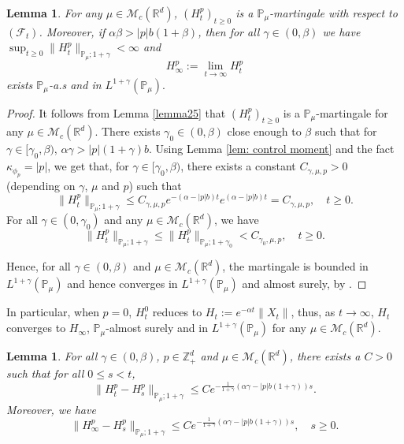 \documentclass[12pt,a4paper]{amsart}
\theoremstyle{plain}
\newtheorem{lem}[thm]{Lemma}
\theoremstyle{definition}
\numberwithin{equation}{section}
\begin{document}
\begin{lem}\label{lemma26}
    For any $\mu\in \mathcal M_c(\mathbb R^d)$, $(H^p_t)_{t\geq 0}$ is a $\mathbb P_\mu$-martingale with respect to $(\mathscr F_t)$. Moreover, if $\alpha\beta>|p|b(1+\beta)$, then for all $\gamma\in (0, \beta)$ we have $\sup_{t\geq 0}\|H_t^p\|_{\mathbb P_\mu;1+\gamma}< \infty$ and
\[
    H_{\infty}^p
    :=\lim_{t\rightarrow \infty}H_t^p
\]
exists $\mathbb{P}_{\mu}$-a.s and in $L^{1+\gamma}(\mathbb{P}_{\mu}).$
\end{lem}
\begin{proof}
  It follows from Lemma \ref{lemma25} that $(H_t^p)_{t\geq 0}$ is a $\mathbb P_\mu$-martingale for any $\mu\in \mathcal M_c(\mathbb R^d)$.
    There exists $\gamma_0 \in (0,\beta)$ close enough to $\beta$ such that for $\gamma\in [\gamma_0, \beta)$, $\alpha\gamma>|p|(1+\gamma)b$.
    Using  Lemma \ref{lem: control moment} and the fact $\kappa_{\phi_p}=|p|$,
   we get that, for $\gamma\in [\gamma_0, \beta)$, there exists
    a constant $C_{\gamma, \mu, p}>0$ (depending on $\gamma$, $\mu$ and $p$)  such that
\[
 	\|H_t^p\|_{\mathbb P_\mu;1+\gamma}
    \leq C_{\gamma, \mu, p} e^{-(\alpha-|p|b)t}e^{(\alpha-|p|b)t}
    =C_{\gamma, \mu, p}, \quad t\geq 0.
\]
   For all $\gamma\in (0, \gamma_0)$ and any $\mu\in \mathcal M_c(\mathbb R^d)$, we have 
\[
	\|H_t^p\|_{\mathbb P_\mu;1+\gamma}
	\leq\|H_t^p\|_{\mathbb P_\mu;1+\gamma_0}
	<C_{\gamma_0, \mu, p},
	\quad t\geq 0.
\]

   Hence, for all $\gamma \in (0,\beta)$ and $\mu\in \mathcal M_c(\mathbb R^d)$,
    the martingale is bounded in $L^{1+\gamma}(\mathbb{P}_{\mu})$ and hence converges in $L^{1+\gamma}(\mathbb{P}_{\mu}) $ and almost surely, by \cite[Theorem 5.4.5]{Durrett2010Probability}.
\end{proof}

In particular, when $p=0$, $H_t^0$ reduces to $H_t:=e^{-\alpha t}\|X_t\|$, thus, as $t\rightarrow \infty$, $H_t$ converges to $H_{\infty}$, $\mathbb{P}_{\mu}$-almost surely and in $L^{1+\gamma}(\mathbb{P}_{\mu})$  for any $\mu\in \mathcal M_c(\mathbb R^d)$.

\begin{lem}\label{lem: control of wt} For all $\gamma\in (0,\beta)$, $p\in \mathbb{Z}_+^d$ and $\mu\in \mathcal M_c(\mathbb R^d)$, there exists a $C> 0$ such that for all $0\leq s<t$,
\[
    \|H^p_t-H^p_s\|_{\mathbb{P}_{\mu};1+\gamma}
    \leq C e^{-\frac{ 1}{1+\gamma}(\alpha\gamma-|p|b(1+\gamma))s}.
\]
Moreover, 
we have
\[
    \|H^p_\infty-H^p_s\|_{\mathbb{P}_{\mu};1+\gamma}
    \leq C e^{-\frac{ 1}{1+\gamma}(\alpha\gamma-|p|b(1+\gamma))s},\quad s\geq 0.
\]
\end{lem}
\end{document}
